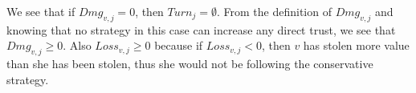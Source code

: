   \noindent We see that if $Dmg_{v, j} = 0$, then $Turn_j = \emptyset$. From the definition of $Dmg_{v,j}$ and knowing that no
  strategy in this case can increase any direct trust, we see that $Dmg_{v,j} \geq 0$. Also $Loss_{v,j} \geq 0$ because
  if $Loss_{v,j} < 0$, then $v$ has stolen more value than she has been stolen, thus she would not be following the
  conservative strategy.
